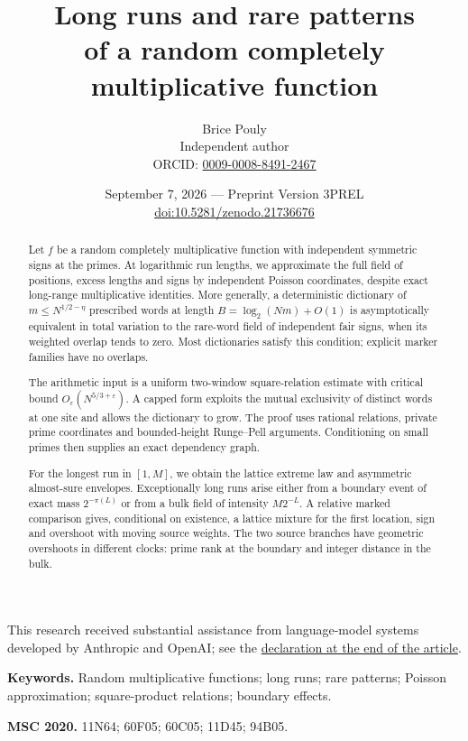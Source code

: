 \documentclass[11pt,a4paper]{article}
\title{\textbf{Long runs and rare patterns}\\[1mm]
\large of a random completely multiplicative function}
\author{Brice Pouly\\[1mm]\small Independent author\\
\small ORCID: \href{https://orcid.org/0009-0008-8491-2467}{0009-0008-8491-2467}}
\date{September 7, 2026 --- Preprint Version 3PREL\\[.3em]
\small\href{https://doi.org/10.5281/zenodo.21736676}{doi:10.5281/zenodo.21736676}}
\begin{document}
\maketitle
\vspace{-0.6em}
\noindent\begin{minipage}{\textwidth}\footnotesize
This research received substantial assistance from language-model systems
developed by Anthropic and OpenAI; see the
\hyperref[sec:ai-assistance]{declaration at the end of the article}.
\end{minipage}\medskip
\begin{abstract}
Let $f$ be a random completely multiplicative function with independent
symmetric signs at the primes. At logarithmic run lengths, we approximate
the full field of positions, excess lengths and signs by independent
Poisson coordinates, despite exact long-range multiplicative identities.
More generally, a deterministic dictionary of $m\le N^{1/2-\eta}$
prescribed words at length $B=\log_2(Nm)+O(1)$ is asymptotically equivalent in total variation to the rare-word
field of independent fair signs, when its weighted
overlap tends to zero. Most dictionaries satisfy this condition; explicit
marker families have no overlaps.

The arithmetic input is a uniform two-window square-relation estimate
with critical bound $O_\varepsilon(N^{5/3+\varepsilon})$. A capped form exploits the mutual exclusivity of distinct words at one site
and allows the dictionary to grow.
The proof uses rational relations, private prime coordinates and
bounded-height Runge--Pell arguments. Conditioning on small primes then
supplies an exact dependency graph.

For the longest run in $[1,M]$, we obtain the lattice extreme law and
asymmetric almost-sure envelopes. Exceptionally long runs arise either
from a boundary event of exact mass $2^{-\pi(L)}$ or from a bulk field
of intensity $M2^{-L}$. A relative marked comparison gives, conditional
on existence, a lattice mixture for the first location, sign and
overshoot with moving source weights. The two source branches have geometric overshoots
in different clocks: prime rank at the boundary and integer distance
in the bulk.
\end{abstract}

\medskip
\noindent\textbf{Keywords.} Random multiplicative functions; long runs;
rare patterns; Poisson approximation; square-product relations; boundary effects.
\par\smallskip
\noindent\textbf{MSC 2020.} 11N64; 60F05; 60C05; 11D45; 94B05.
\tableofcontents








\clearpage


\end{document}
